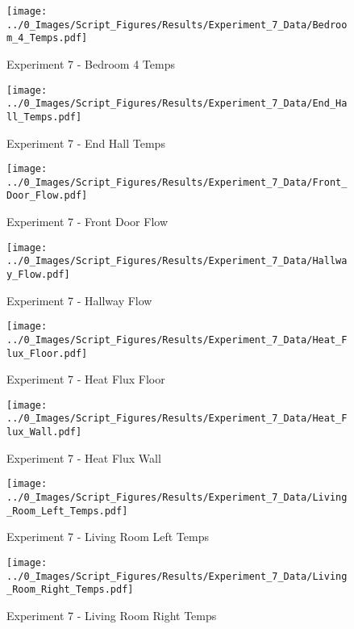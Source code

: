 	\clearpage

	\begin{figure}[H]
		\centering
		\texttt{[image: ../0\_Images/Script\_Figures/Results/Experiment\_7\_Data/Bedroom\_4\_Temps.pdf]}
		\caption[]{Experiment 7 - Bedroom 4 Temps}
	\end{figure}
 

	\begin{figure}[H]
		\centering
		\texttt{[image: ../0\_Images/Script\_Figures/Results/Experiment\_7\_Data/End\_Hall\_Temps.pdf]}
		\caption[]{Experiment 7 - End Hall Temps}
	\end{figure}
 
	\clearpage

	\begin{figure}[H]
		\centering
		\texttt{[image: ../0\_Images/Script\_Figures/Results/Experiment\_7\_Data/Front\_Door\_Flow.pdf]}
		\caption[]{Experiment 7 - Front Door Flow}
	\end{figure}
 

	\begin{figure}[H]
		\centering
		\texttt{[image: ../0\_Images/Script\_Figures/Results/Experiment\_7\_Data/Hallway\_Flow.pdf]}
		\caption[]{Experiment 7 - Hallway Flow}
	\end{figure}
 
	\clearpage

	\begin{figure}[H]
		\centering
		\texttt{[image: ../0\_Images/Script\_Figures/Results/Experiment\_7\_Data/Heat\_Flux\_Floor.pdf]}
		\caption[]{Experiment 7 - Heat Flux Floor}
	\end{figure}
 

	\begin{figure}[H]
		\centering
		\texttt{[image: ../0\_Images/Script\_Figures/Results/Experiment\_7\_Data/Heat\_Flux\_Wall.pdf]}
		\caption[]{Experiment 7 - Heat Flux Wall}
	\end{figure}
 
	\clearpage

	\begin{figure}[H]
		\centering
		\texttt{[image: ../0\_Images/Script\_Figures/Results/Experiment\_7\_Data/Living\_Room\_Left\_Temps.pdf]}
		\caption[]{Experiment 7 - Living Room Left Temps}
	\end{figure}
 

	\begin{figure}[H]
		\centering
		\texttt{[image: ../0\_Images/Script\_Figures/Results/Experiment\_7\_Data/Living\_Room\_Right\_Temps.pdf]}
		\caption[]{Experiment 7 - Living Room Right Temps}
	\end{figure}
 

